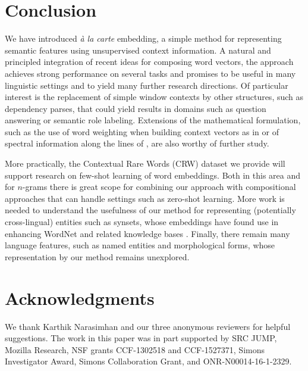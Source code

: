 \documentclass[11pt,a4paper]{article}
\begin{document}
\section{Conclusion}
We have introduced {\em\`a la carte} embedding, a simple method for representing semantic features using unsupervised context information.
A natural and principled integration of recent ideas for composing word vectors, the approach achieves strong performance on several tasks and promises to be useful in many linguistic settings and to yield many further research directions.
Of particular interest is the replacement of simple window contexts by other structures, such as dependency parses, that could yield results in domains such as question answering or semantic role labeling.
Extensions of the mathematical formulation, such as the use of word weighting when building context vectors as in \citet{Arora:18b} or of spectral information along the lines of \citet{Mu:18}, are also worthy of further study.

More practically, the Contextual Rare Words (CRW) dataset we provide will support research on few-shot learning of word embeddings.
Both in this area and for $n$-grams there is great scope for combining our approach with compositional approaches \cite{Bojanowski:16,Poliak:17} that can handle settings such as zero-shot learning.
More work is needed to understand the usefulness of our method for representing (potentially cross-lingual) entities such as synsets, whose embeddings have found use in enhancing WordNet and related knowledge bases \cite{Camacho:16,Khodak:17}.
Finally, there remain many language features, such as named entities and morphological forms, whose representation by our method remains unexplored.

\section*{Acknowledgments}
We thank Karthik Narasimhan and our three anonymous reviewers for helpful suggestions.
The work in this paper was in part supported by SRC JUMP, Mozilla Research, NSF grants CCF-1302518 and CCF-1527371, Simons Investigator Award, Simons Collaboration Grant, and ONR-N00014-16-1-2329.



\end{document}

